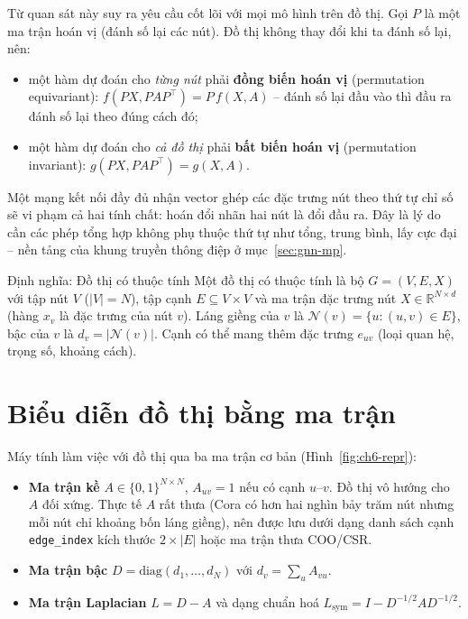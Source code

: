 
Từ quan sát này suy ra yêu cầu cốt lõi với mọi mô hình trên đồ thị. Gọi $P$ là một ma trận hoán vị (đánh số lại các
nút). Đồ thị không thay đổi khi ta đánh số lại, nên:
\begin{itemize}
  \item một hàm dự đoán cho \emph{từng nút} phải \textbf{đồng biến hoán vị} (permutation equivariant):
        $f(PX, PAP^{\top}) = P\,f(X, A)$ -- đánh số lại đầu vào thì đầu ra đánh số lại theo đúng cách đó;
  \item một hàm dự đoán cho \emph{cả đồ thị} phải \textbf{bất biến hoán vị} (permutation invariant):
        $g(PX, PAP^{\top}) = g(X, A)$.
\end{itemize}
Một mạng kết nối đầy đủ nhận vector ghép các đặc trưng nút theo thứ tự chỉ số sẽ vi phạm cả hai tính chất: hoán đổi
nhãn hai nút là đổi đầu ra. Đây là lý do cần các phép tổng hợp không phụ thuộc thứ tự như tổng, trung bình, lấy cực
đại -- nền tảng của khung truyền thông điệp ở mục~\ref{sec:gnn-mp}.

\begin{dinhnghia}{Định nghĩa: Đồ thị có thuộc tính}
Một đồ thị có thuộc tính là bộ $G=(V,E,X)$ với tập nút $V$ ($|V|=N$), tập cạnh $E\subseteq V\times V$ và ma trận
đặc trưng nút $X\in\mathbb R^{N\times d}$ (hàng $x_v$ là đặc trưng của nút $v$). Láng giềng của $v$ là
$\mathcal N(v)=\{u:(u,v)\in E\}$, bậc của $v$ là $d_v=|\mathcal N(v)|$. Cạnh có thể mang thêm đặc trưng $e_{uv}$
(loại quan hệ, trọng số, khoảng cách).
\end{dinhnghia}

\section{Biểu diễn đồ thị bằng ma trận}
\label{sec:gnn-matrix}

Máy tính làm việc với đồ thị qua ba ma trận cơ bản (Hình~\ref{fig:ch6-repr}):
\begin{itemize}
  \item \textbf{Ma trận kề} $A\in\{0,1\}^{N\times N}$, $A_{uv}=1$ nếu có cạnh $u$--$v$. Đồ thị vô hướng cho $A$ đối
        xứng. Thực tế $A$ rất thưa (Cora có hơn hai nghìn bảy trăm nút nhưng mỗi nút chỉ khoảng bốn láng giềng), nên
        được lưu dưới dạng danh sách cạnh \texttt{edge\_index} kích thước $2\times|E|$ hoặc ma trận thưa COO/CSR.
  \item \textbf{Ma trận bậc} $D=\mathrm{diag}(d_1,\dots,d_N)$ với $d_v=\sum_u A_{vu}$.
  \item \textbf{Ma trận Laplacian} $L=D-A$ và dạng chuẩn hoá $L_{\text{sym}}=I-D^{-1/2}AD^{-1/2}$.
\end{itemize}


